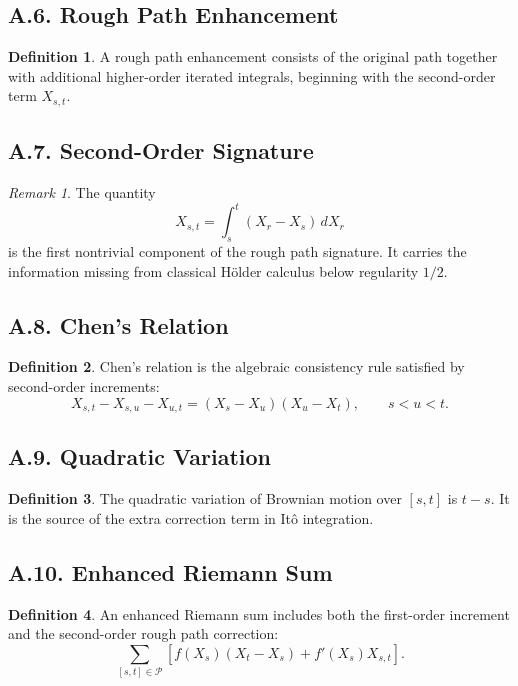 \documentclass[11pt]{article}
\theoremstyle{definition}
\newtheorem{definition}{Definition}
\theoremstyle{remark}
\newtheorem{remark}{Remark}
\begin{document}
\subsection*{A.6. Rough Path Enhancement}
\begin{definition}
A rough path enhancement consists of the original path together with additional higher-order iterated integrals, beginning with the second-order term \(X_{s,t}\).
\end{definition}

\subsection*{A.7. Second-Order Signature}
\begin{remark}
The quantity
\[
X_{s,t}=\int_s^t (X_r-X_s)\,dX_r
\]
is the first nontrivial component of the rough path signature. It carries the information missing from classical Hölder calculus below regularity \(1/2\).
\end{remark}

\subsection*{A.8. Chen's Relation}
\begin{definition}
Chen's relation is the algebraic consistency rule satisfied by second-order increments:
\[
X_{s,t}-X_{s,u}-X_{u,t}=(X_s-X_u)(X_u-X_t),
\qquad s<u<t.
\]
\end{definition}

\subsection*{A.9. Quadratic Variation}
\begin{definition}
The quadratic variation of Brownian motion over \([s,t]\) is \(t-s\). It is the source of the extra correction term in It\^o integration.
\end{definition}

\subsection*{A.10. Enhanced Riemann Sum}
\begin{definition}
An enhanced Riemann sum includes both the first-order increment and the second-order rough path correction:
\[
\sum_{[s,t]\in\mathcal P}
\left[f(X_s)(X_t-X_s)+f'(X_s)X_{s,t}\right].
\]
\end{definition}
\end{document}
